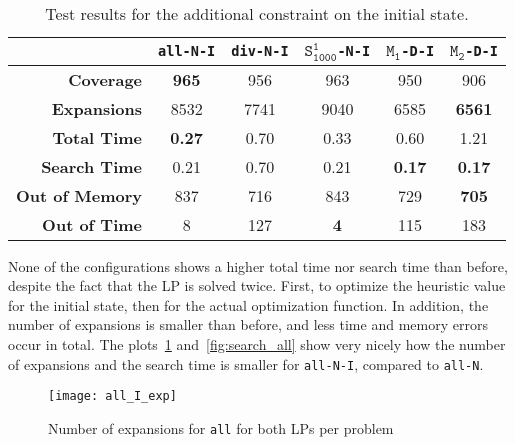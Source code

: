 \begin{table}[h!]
    \begin{center}
        \begin{tabular}{|r|c|c|c|c|c|}
            \hline
            & \textbf{\texttt{all-N-I}} & \textbf{\texttt{div-N-I}} & \textbf{$\texttt{S}_\texttt{1000}^\texttt{1}$\texttt{-N-I}} & \textbf{$\texttt{M}_\texttt{1}$\texttt{-D-I}} & \textbf{$\texttt{M}_\texttt{2}$\texttt{-D-I}} \\
            \hline \hline
            \textbf{Coverage}       & \textbf{965}  & 956   & 963       & 950           & 906 \\ \hline
            \textbf{Expansions}     & 8532          & 7741  & 9040      & 6585          & \textbf{6561} \\ \hline
            \textbf{Total Time}     & \textbf{0.27} & 0.70  & 0.33      & 0.60          & 1.21 \\ \hline
            \textbf{Search Time}    & 0.21          & 0.70  & 0.21      & \textbf{0.17} & \textbf{0.17} \\ \hline
            \textbf{Out of Memory}  & 837           & 716   & 843       & 729           & \textbf{705} \\ \hline
            \textbf{Out of Time}    & 8             & 127   & \textbf{4}& 115           & 183 \\ \hline
        \end{tabular}
        \caption{Test results for the additional constraint on the initial state.}
        \label{table:initial-constraint}
    \end{center}
\end{table}

None of the configurations shows a higher total time nor search time than before, despite the fact that the LP is solved twice.
First, to optimize the heuristic value for the initial state, then for the actual optimization function.
In addition, the number of expansions is smaller than before, and less time and memory errors occur in total.
The plots~\ref{fig:exp_all} and~\ref{fig:search_all} show very nicely how the number of expansions and the search time is smaller for \texttt{all-N-I}, compared to \texttt{all-N}.

\begin{figure}[h!]
\centering
    \texttt{[image: all\_I\_exp]}
    \caption{Number of expansions for \texttt{all} for both LPs per problem}
    \label{fig:exp_all}
\end{figure}

